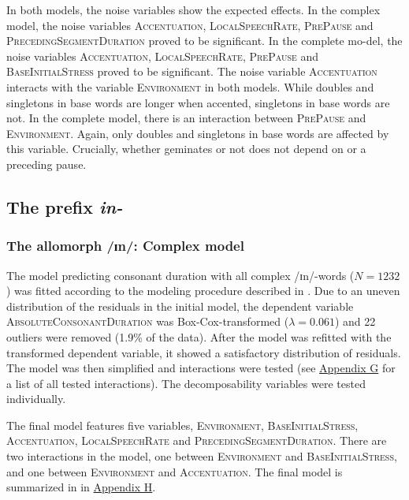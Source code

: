  In both models, the noise variables show the expected effects. In the complex model, the noise variables \textsc{Accentuation}, \textsc{LocalSpeechRate}, \textsc{PrePause} and \textsc{PrecedingSegmentDuration} proved to be significant. In the complete mo-del, the noise variables \textsc{Accentuation}, \textsc{LocalSpeechRate}, \textsc{PrePause} and \textsc{BaseInitialStress} proved to be significant.
 The noise variable \textsc{Accentuation} interacts with the variable \textsc{Environment} in both models. While doubles and singletons in base words are longer when accented, singletons in base words are not. In the complete model, there is an interaction between \textsc{PrePause} and \textsc{Environment}. Again, only doubles and singletons in base words are affected by this variable. Crucially,  whether  geminates or not does not depend on  or a preceding pause. 


\subsection{The prefix \textit{in-}} \label{in experiment}\largerpage

\subsubsection{The allomorph /ɪn/: Complex model}

The model predicting consonant duration with all complex /ɪn/-words ($N=1232$) was fitted according to the modeling procedure described in . Due to an uneven distribution of the residuals in the initial model, the dependent variable \textsc{AbsoluteConsonantDuration} was Box-Cox-transformed ($\lambda = 0.061$) and 22 outliers were removed (1.9\% of the data).
After the model was refitted with the transformed dependent variable, it showed a satisfactory distribution of residuals.  The model was then simplified and interactions were tested (see \hyperref[Appendix G Summaries of tested interactions in experimental study]{Appendix G} for a list of all tested interactions).
The decomposability variables were tested individually.

The final model features five variables, \textsc{Environment}, \textsc{BaseInitialStress}, \textsc{Accentuation}, \textsc{LocalSpeechRate} and \textsc{PrecedingSegmentDuration}. 
There are two interactions in the model, one between \textsc{Environment} and \textsc{BaseInitialStress}, and one between \textsc{Environment} and \textsc{Accentuation}. The final model is summarized in  in \hyperref[Appendix H: Model Summaries Experiment]{Appendix H}.



